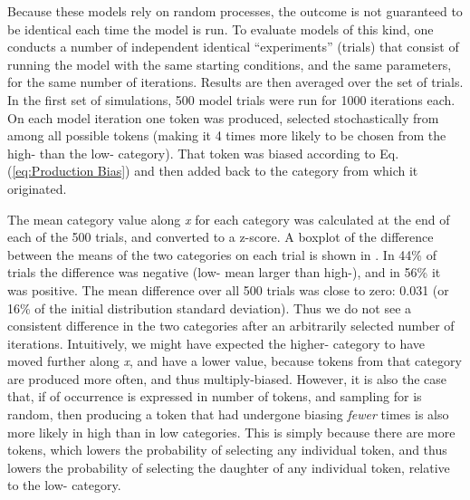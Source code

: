 Because these models rely on random processes, the outcome is not
guaranteed to be identical each time the model is run. To evaluate
models of this kind, one conducts a number of independent identical
``experiments'' (trials) that consist of running the model with the
same starting conditions, and the same parameters, for the same number
of iterations. Results are then averaged over the set of trials. In
the first set of simulations, 500 model trials were run for 1000 iterations
each. On each model iteration one token was produced, selected stochastically
from among all possible tokens (making it 4 times more likely to be
chosen from the high- than the low- category). That
token was biased according to Eq. (\ref{eq:Production Bias}) and
then added back to the category from which it originated. 

The mean category value along \emph{x} for each category was calculated
at the end of each of the 500 trials, and converted to a z-score.
A boxplot of the difference between the means of the two categories
on each trial is shown in . In 44\% of trials the
difference was negative (low- mean larger than high-),
and in 56\% it was positive. The mean difference over all 500 trials
was close to zero: 0.031 (or 16\% of the initial distribution standard
deviation). Thus we do not see a consistent difference in the two
categories after an arbitrarily selected number of iterations. Intuitively,
we might have expected the higher- category to have moved
further along \emph{x}, and have a lower value, because tokens from
that category are produced more often, and thus multiply-biased.
However, it is also the case that, if  of occurrence is expressed
in number of tokens, and sampling for  is random, then producing
a token that had undergone biasing \emph{fewer} times is also more
likely in high than in low  categories. This is simply because
there are more tokens, which lowers the probability of selecting any
individual token, and thus lowers the probability of selecting the
daughter of any individual token, relative to the low- category. 

